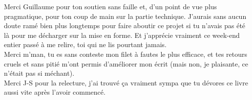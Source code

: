 \parbr

Merci Guillaume pour ton soutien sans faille et, d'un point de vue plus pragmatique, pour ton coup de main sur la partie technique. J'aurais sans aucun doute ramé bien plus longtemps pour faire aboutir ce projet si tu n'avais pas été là pour me décharger sur la mise en forme. Et j'apprécie vraiment ce week-end entier passé à me relire, toi qui ne lis pourtant jamais. \\

Merci m'man, tu es sans conteste mon filet à fautes le plus efficace, et tes retours cruels et sans pitié m'ont permis d'améliorer mon écrit (mais non, je plaisante, ce n'était pas si méchant). \\

Merci J-S pour la relecture, j'ai trouvé ça vraiment sympa que tu dévores ce livre aussi vite après l'avoir commencé.



